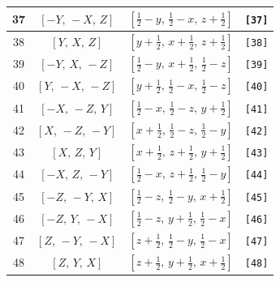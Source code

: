 \documentclass[fleqn,8pt]{jsarticle}
\begin{document}
\begin{longtable}{cccc}
37 & $\left[ - Y,\, - X,\, Z \right]$ & $\left[ \frac{1}{2} - y,\, \frac{1}{2} - x,\, z + \frac{1}{2} \right]$ & {\tt [37]} \\ \hline
38 & $\left[ Y,\, X,\, Z \right]$ & $\left[ y + \frac{1}{2},\, x + \frac{1}{2},\, z + \frac{1}{2} \right]$ & {\tt [38]} \\ \hline
39 & $\left[ - Y,\, X,\, - Z \right]$ & $\left[ \frac{1}{2} - y,\, x + \frac{1}{2},\, \frac{1}{2} - z \right]$ & {\tt [39]} \\ \hline
40 & $\left[ Y,\, - X,\, - Z \right]$ & $\left[ y + \frac{1}{2},\, \frac{1}{2} - x,\, \frac{1}{2} - z \right]$ & {\tt [40]} \\ \hline
41 & $\left[ - X,\, - Z,\, Y \right]$ & $\left[ \frac{1}{2} - x,\, \frac{1}{2} - z,\, y + \frac{1}{2} \right]$ & {\tt [41]} \\ \hline
42 & $\left[ X,\, - Z,\, - Y \right]$ & $\left[ x + \frac{1}{2},\, \frac{1}{2} - z,\, \frac{1}{2} - y \right]$ & {\tt [42]} \\ \hline
43 & $\left[ X,\, Z,\, Y \right]$ & $\left[ x + \frac{1}{2},\, z + \frac{1}{2},\, y + \frac{1}{2} \right]$ & {\tt [43]} \\ \hline
44 & $\left[ - X,\, Z,\, - Y \right]$ & $\left[ \frac{1}{2} - x,\, z + \frac{1}{2},\, \frac{1}{2} - y \right]$ & {\tt [44]} \\ \hline
45 & $\left[ - Z,\, - Y,\, X \right]$ & $\left[ \frac{1}{2} - z,\, \frac{1}{2} - y,\, x + \frac{1}{2} \right]$ & {\tt [45]} \\ \hline
46 & $\left[ - Z,\, Y,\, - X \right]$ & $\left[ \frac{1}{2} - z,\, y + \frac{1}{2},\, \frac{1}{2} - x \right]$ & {\tt [46]} \\ \hline
47 & $\left[ Z,\, - Y,\, - X \right]$ & $\left[ z + \frac{1}{2},\, \frac{1}{2} - y,\, \frac{1}{2} - x \right]$ & {\tt [47]} \\ \hline
48 & $\left[ Z,\, Y,\, X \right]$ & $\left[ z + \frac{1}{2},\, y + \frac{1}{2},\, x + \frac{1}{2} \right]$ & {\tt [48]} \\
\end{longtable}
\end{document}
